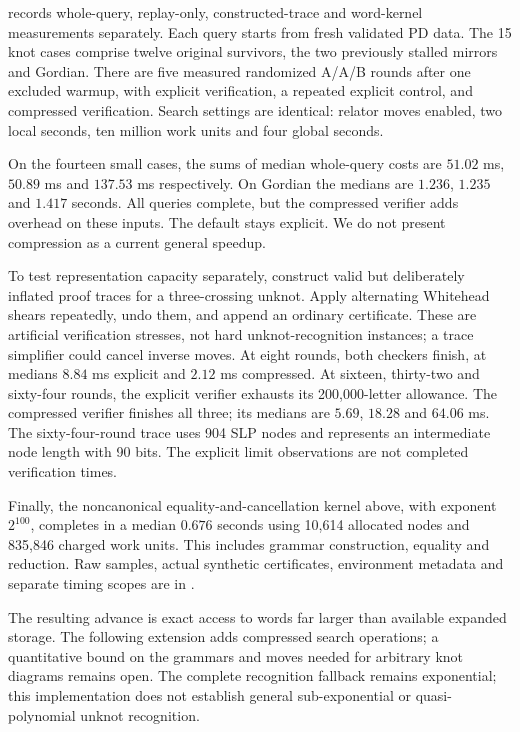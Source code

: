  records whole-query, replay-only,
constructed-trace and word-kernel measurements separately.  Each query
starts from fresh validated PD data.  The 15 knot cases comprise twelve
original survivors, the two previously stalled mirrors and Gordian.
There are five measured randomized A/A/B rounds after one excluded warmup,
with explicit verification, a repeated explicit control, and compressed
verification.  Search settings are identical: relator moves enabled,
two local seconds, ten million work units and four global seconds.

On the fourteen small cases, the sums of median whole-query costs are
$51.02$ ms, $50.89$ ms and $137.53$ ms respectively.  On Gordian the medians
are $1.236$, $1.235$ and $1.417$ seconds.  All queries complete, but the
compressed verifier adds overhead on these inputs.  The default stays
explicit.  We do not present compression as a current general speedup.

To test representation capacity separately, construct valid but deliberately
inflated proof traces for a three-crossing unknot.  Apply alternating
Whitehead shears repeatedly, undo them, and append an ordinary certificate.
These are artificial verification stresses, not hard unknot-recognition
instances; a trace simplifier could cancel inverse moves.  At eight rounds,
both checkers finish, at medians $8.84$ ms explicit and $2.12$ ms compressed.
At sixteen, thirty-two and sixty-four rounds, the explicit verifier exhausts
its 200,000-letter allowance.  The compressed verifier finishes all three;
its medians are $5.69$, $18.28$ and $64.06$ ms.  The sixty-four-round trace
uses 904 SLP nodes and represents an intermediate node length with 90 bits.
The explicit limit observations are not completed verification times.

Finally, the noncanonical equality-and-cancellation kernel above, with
exponent $2^{100}$, completes in a median $0.676$ seconds using 10,614
allocated nodes and 835,846 charged work units.  This includes grammar
construction, equality and reduction.  Raw samples, actual synthetic
certificates, environment metadata and separate timing scopes are in
.

The resulting advance is exact access to words far larger than available
expanded storage.  The following extension adds compressed search
operations; a quantitative bound on the grammars and moves needed for
arbitrary knot diagrams remains open.  The complete recognition fallback remains
exponential; this implementation does not establish general sub-exponential
or quasi-polynomial unknot recognition.

